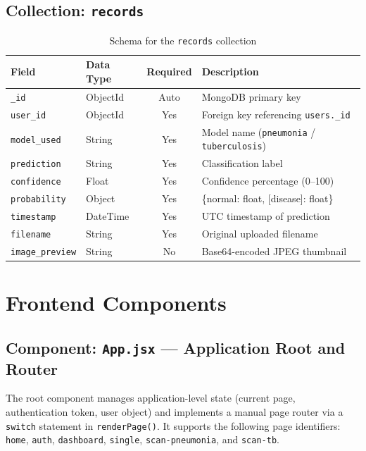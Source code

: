 \documentclass[12pt, a4paper, oneside]{report}
\begin{document}
\subsection{Collection: \texttt{records}}

\begin{table}[H]
\centering
\caption{Schema for the \texttt{records} collection}
\label{tab:records_schema}
\begin{tabularx}{\textwidth}{llcX}
\toprule
\textbf{Field} & \textbf{Data Type} & \textbf{Required} & \textbf{Description} \\
\midrule
\texttt{\_id} & ObjectId & Auto & MongoDB primary key \\
\texttt{user\_id} & ObjectId & Yes & Foreign key referencing \texttt{users.\_id} \\
\texttt{model\_used} & String & Yes & Model name (\texttt{pneumonia} / \texttt{tuberculosis}) \\
\texttt{prediction} & String & Yes & Classification label \\
\texttt{confidence} & Float & Yes & Confidence percentage (0--100) \\
\texttt{probability} & Object & Yes & \{normal: float, [disease]: float\} \\
\texttt{timestamp} & DateTime & Yes & UTC timestamp of prediction \\
\texttt{filename} & String & Yes & Original uploaded filename \\
\texttt{image\_preview} & String & No & Base64-encoded JPEG thumbnail \\
\bottomrule
\end{tabularx}
\end{table}

\section{Frontend Components}
\label{sec:frontend_components}

\subsection{Component: \texttt{App.jsx} --- Application Root and Router}

The root component manages application-level state (current page, authentication token, user object) and implements a manual page router via a \texttt{switch} statement in \texttt{renderPage()}. It supports the following page identifiers: \texttt{home}, \texttt{auth}, \texttt{dashboard}, \texttt{single}, \texttt{scan-pneumonia}, and \texttt{scan-tb}.
\end{document}
